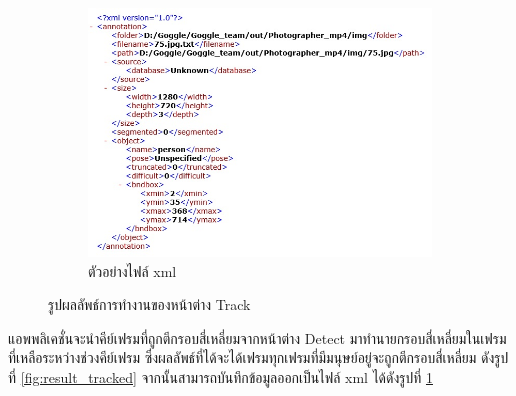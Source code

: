 \begin{figure}[!ht]
\begin{subfigure}[b]{0.7\linewidth}
      \includegraphics[width=\linewidth]{chapter4/images/Result/result_select7.jpg}
      \caption{ตัวอย่างไฟล์ xml}
      \label{fig:result_track_xml}
    \end{subfigure}
    \caption{รูปผลลัพธ์การทำงานของหน้าต่าง Track}
    \label{fig:result_track}
  \end{figure}
แอพพลิเคชั่นจะนำคีย์เฟรมที่ถูกตีกรอบสี่เหลี่ยมจากหน้าต่าง Detect มาทำนายกรอบสี่เหลี่ยมในเฟรมที่เหลือระหว่างช่วงคีย์เฟรม ซึ่งผลลัพธ์ที่ได้จะได้เฟรมทุกเฟรมที่มีมนุษย์อยู่จะถูกตีกรอบสี่เหลี่ยม 
ดังรูปที่ \ref{fig:result_tracked} จากนั้นสามารถบันทึกข้อมูลออกเป็นไฟล์ xml ได้ดังรูปที่ \ref{fig:result_track_xml}

\clearpage
